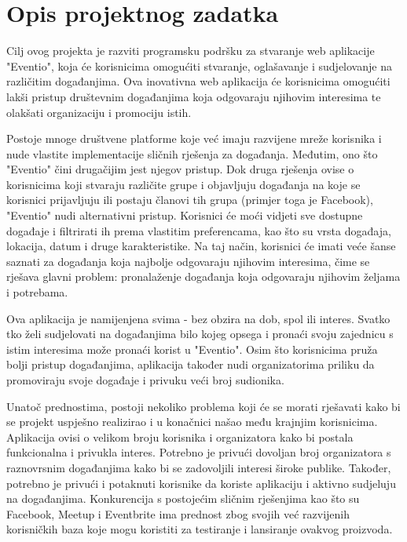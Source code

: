 \chapter{Opis projektnog zadatka}
		
		
		Cilj ovog projekta je razviti programsku podršku za stvaranje web aplikacije "Eventio", koja će korisnicima omogućiti stvaranje, oglašavanje i sudjelovanje na različitim događanjima. Ova inovativna web aplikacija će korisnicima omogućiti lakši pristup društevnim događanjima koja odgovaraju njihovim interesima te olakšati organizaciju i promociju istih.
		
		Postoje mnoge društvene platforme koje već imaju razvijene mreže korisnika i nude vlastite implementacije sličnih rješenja za događanja. Međutim, ono što "Eventio" čini drugačijim jest njegov pristup. Dok druga rješenja ovise o korisnicima koji stvaraju različite grupe i objavljuju događanja na koje se korisnici prijavljuju ili postaju članovi tih grupa (primjer toga je Facebook), "Eventio" nudi alternativni pristup. Korisnici će moći vidjeti sve dostupne događaje i filtrirati ih prema vlastitim preferencama, kao što su vrsta događaja, lokacija, datum i druge karakteristike. Na taj način, korisnici će imati veće šanse saznati za događanja koja najbolje odgovaraju njihovim interesima, čime se rješava glavni problem: pronalaženje događanja koja odgovaraju njihovim željama i potrebama.
		
		Ova aplikacija je namijenjena svima - bez obzira na dob, spol ili interes. Svatko tko želi sudjelovati na događanjima bilo kojeg opsega i pronaći svoju zajednicu s istim interesima može pronaći korist u "Eventio". Osim što korisnicima pruža bolji pristup događanjima, aplikacija također nudi organizatorima priliku da promoviraju svoje događaje i privuku veći broj sudionika.
		
		Unatoč prednostima, postoji nekoliko problema koji će se morati rješavati kako bi se projekt uspješno realizirao i u konačnici našao među krajnjim korisnicima. Aplikacija ovisi o velikom broju korisnika i organizatora kako bi postala funkcionalna i privukla interes. Potrebno je privući dovoljan broj organizatora s raznovrsnim događanjima kako bi se zadovoljili interesi široke publike. Također, potrebno je privući i potaknuti korisnike da koriste aplikaciju i aktivno sudjeluju na događanjima. Konkurencija s postojećim sličnim rješenjima kao što su Facebook, Meetup i Eventbrite ima prednost zbog svojih već razvijenih korisničkih baza koje mogu koristiti za testiranje i lansiranje ovakvog proizvoda.
		
